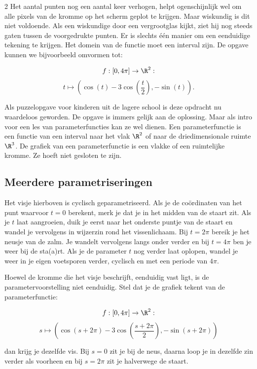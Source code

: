 \begin{multicols}{2}
Het aantal punten nog een aantal keer verhogen, helpt ogenschijnlijk wel om alle pixels van de kromme op het scherm geplot te krijgen. Maar wiskundig is dit niet voldoende. Als een wiskundige door een vergrootglas kijkt, ziet hij nog steeds gaten tussen de voorgedrukte punten. Er is slechts één manier om een eenduidige tekening te krijgen. Het domein van de functie moet een interval zijn. De opgave kunnen we bijvoorbeeld omvormen tot:

\[f: [0, 4 \pi] \to  \R^2: \]
\[t \mapsto \left(\cos(t)-3 \cos \left(\frac{t}{2} \right),-\sin(t) \right).\]




Als puzzelopgave voor kinderen uit de lagere school is deze opdracht nu waardeloos geworden. De opgave is immers gelijk aan de oplossing. Maar als intro voor een les van parameterfuncties kan ze wel dienen. Een parameterfunctie is een functie van een interval naar het vlak $\R^2$ of naar de driedimensionale ruimte $\R^3$. De grafiek van een parameterfunctie is een vlakke of een ruimtelijke kromme. Ze hoeft niet gesloten te zijn.

\subsection{Meerdere parametriseringen}

Het visje hierboven is cyclisch geparametriseerd. Als je de coördinaten van het punt waarvoor $t=0$ berekent, merk je dat  je in het midden van de staart zit. Als je $t$ laat aangroeien, duik je eerst naar het onderste puntje van de staart en wandel je vervolgens in wijzerzin rond het vissenlichaam. Bij $t=2\pi$ bereik je het neusje van de zalm. Je wandelt vervolgens langs onder verder en bij $t=4\pi$ ben je weer bij de sta(a)rt. Als je de parameter $t$  nog verder laat oplopen, wandel je weer in je eigen voetsporen verder, cyclisch en met een periode van $4\pi$.

Hoewel de kromme die het visje beschrijft, eenduidig vast ligt, is de parametervoorstelling niet eenduidig. Stel dat je de grafiek tekent van de parameterfunctie:

\[f: [0, 4 \pi] \to  \R^2: \]
\[s \mapsto \left(\cos(s+2\pi )-3 \cos \left(\frac{s+2\pi}{2} \right),-\sin(s+2\pi) \right)\]

dan krijg je dezelfde vis. Bij $s=0$ zit je bij de neus, daarna loop je in dezelfde zin verder als voorheen en bij $s=2\pi$ zit je halverwege de staart. 


\end{multicols}
